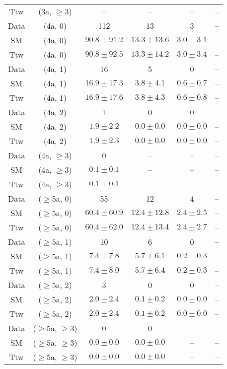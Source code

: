 \begin{table}[h!]
{\begin{tabular}{cccccc}
	Ttw & (3a, $\ge3$) & -- & -- & -- & -- \\[0.5ex] 
	Data & (4a, 0) & 112 & 13 & 3 & -- \\[0.5ex] 
	SM & (4a, 0) & $90.8\pm 91.2$ & $13.3\pm 13.6$ & $3.0\pm 3.1$ & -- \\[0.5ex] 
	Ttw & (4a, 0) & $90.8\pm 92.5$ & $13.3\pm 14.2$ & $3.0\pm 3.4$ & -- \\[0.5ex] 
	Data & (4a, 1) & 16 & 5 & 0 & -- \\[0.5ex] 
	SM & (4a, 1) & $16.9\pm 17.3$ & $3.8\pm 4.1$ & $0.6\pm 0.7$ & -- \\[0.5ex] 
	Ttw & (4a, 1) & $16.9\pm 17.6$ & $3.8\pm 4.3$ & $0.6\pm 0.8$ & -- \\[0.5ex] 
	Data & (4a, 2) & 1 & 0 & 0 & -- \\[0.5ex] 
	SM & (4a, 2) & $1.9\pm 2.2$ & $0.0\pm 0.0$ & $0.0\pm 0.0$ & -- \\[0.5ex] 
	Ttw & (4a, 2) & $1.9\pm 2.3$ & $0.0\pm 0.0$ & $0.0\pm 0.0$ & -- \\[0.5ex] 
	Data & (4a, $\ge3$) & 0 & -- & -- & -- \\[0.5ex] 
	SM & (4a, $\ge3$) & $0.1\pm 0.1$ & -- & -- & -- \\[0.5ex] 
	Ttw & (4a, $\ge3$) & $0.1\pm 0.1$ & -- & -- & -- \\[0.5ex] 
	Data & ($\ge5$a, 0) & 55 & 12 & 4 & -- \\[0.5ex] 
	SM & ($\ge5$a, 0) & $60.4\pm 60.9$ & $12.4\pm 12.8$ & $2.4\pm 2.5$ & -- \\[0.5ex] 
	Ttw & ($\ge5$a, 0) & $60.4\pm 62.0$ & $12.4\pm 13.4$ & $2.4\pm 2.7$ & -- \\[0.5ex] 
	Data & ($\ge5$a, 1) & 10 & 6 & 0 & -- \\[0.5ex] 
	SM & ($\ge5$a, 1) & $7.4\pm 7.8$ & $5.7\pm 6.1$ & $0.2\pm 0.3$ & -- \\[0.5ex] 
	Ttw & ($\ge5$a, 1) & $7.4\pm 8.0$ & $5.7\pm 6.4$ & $0.2\pm 0.3$ & -- \\[0.5ex] 
	Data & ($\ge5$a, 2) & 3 & 0 & 0 & -- \\[0.5ex] 
	SM & ($\ge5$a, 2) & $2.0\pm 2.4$ & $0.1\pm 0.2$ & $0.0\pm 0.0$ & -- \\[0.5ex] 
	Ttw & ($\ge5$a, 2) & $2.0\pm 2.4$ & $0.1\pm 0.2$ & $0.0\pm 0.0$ & -- \\[0.5ex] 
	Data & ($\ge5$a, $\ge3$) & 0 & 0 & -- & -- \\[0.5ex] 
	SM & ($\ge5$a, $\ge3$) & $0.0\pm 0.0$ & $0.0\pm 0.0$ & -- & -- \\[0.5ex] 
	Ttw & ($\ge5$a, $\ge3$) & $0.0\pm 0.0$ & $0.0\pm 0.0$ & -- & -- \\[0.5ex] 
	\hline
	\hline
\end{tabular}}
\end{table}

